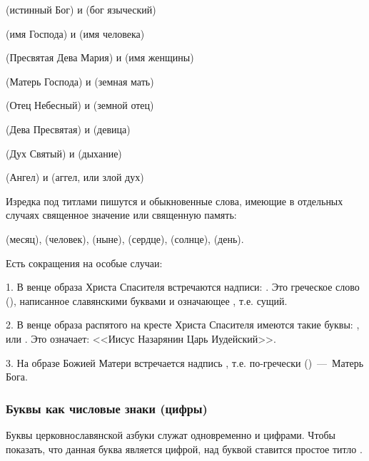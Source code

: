 \documentclass[11pt,a4paper,oneside]{memoir}
\begin{document}
    {} (истинный Бог) и {} (бог языческий)

    {} (имя Господа) и {} (имя человека)

    {} (Пресвятая Дева Мария) и {} (имя женщины)

    {} (Матерь Господа) и {} (земная мать)

    {} (Отец Небесный) и {} (земной отец)

    {} (Дева Пресвятая) и {} (девица)

    {} (Дух Святый) и {} (дыхание)

    {} (Ангел) и {} (аггел, или злой дух)
    \medskip

    Изредка под титлами пишутся и обыкновенные слова, имеющие в отдельных случаях священное значение или священную память:
    
    {} (месяц), {} (человек), {} (ныне), {} (сердце), {} (солнце), {} (день).
    
    Есть сокращения на особые случаи:
    
    1. В венце образа Христа Спасителя встречаются надписи: {}. Это греческое слово (), написанное славянскими буквами и означающее {}, т.е. сущий.
    
    2. В венце образа распятого на кресте Христа Спасителя имеются такие буквы: {}, или {}. Это означает: <<Иисус Назарянин Царь Иудейский>>.
    
    3. На образе Божией Матери встречается надпись {}, т.е. по-гречески ()~---~Матерь Бога.
        
                \subsubsection{Буквы как числовые знаки (цифры)}

    Буквы церковнославянской азбуки служат одновременно и цифрами. Чтобы показать, что данная буква является цифрой, над буквой ставится простое титло {}.
\end{document}
